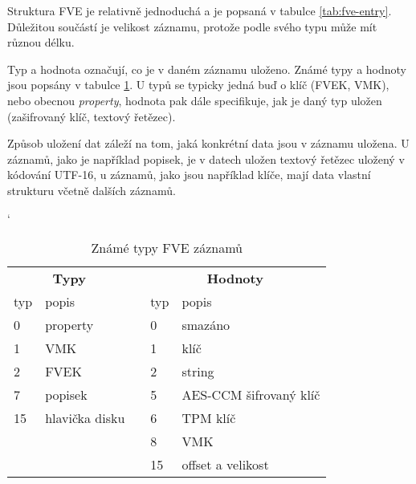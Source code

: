 Struktura FVE je relativně jednoduchá a je popsaná v tabulce \ref{tab:fve-entry}. Důležitou součástí je velikost záznamu, protože podle svého typu může mít různou délku.


Typ a hodnota označují, co je v daném záznamu uloženo. Známé typy a hodnoty jsou popsány v tabulce \ref{tab:fve-entry-types}. U typů se typicky jedná buď o klíč (FVEK, VMK), nebo obecnou \emph{property}, hodnota pak dále specifikuje, jak je daný typ uložen (zašifrovaný klíč, textový řetězec).

Způsob uložení dat záleží na tom, jaká konkrétní data jsou v záznamu uložena. U  záznamů, jako je například popisek, je v datech uložen textový řetězec uložený v kódování UTF-16, u  záznamů, jako jsou například klíče, mají data vlastní strukturu včetně dalších záznamů.

\begin{table}[h]
\catcode`
\captionsetup{width=0.65\linewidth}
\caption{Známé typy FVE záznamů}
\label{tab:fve-entry-types}
\begin{center}
\centering
\begin{tabular}{|l|l|c|l|l|}
  \cline{1-2} \cline{4-5}
   \multicolumn{2}{|c|}{\textbf{Typy}} &  & \multicolumn{2}{|c|}{\textbf{Hodnoty}} \\ \cline{1-2} \cline{4-5}
   typ & popis &  & typ & popis \\ \cline{1-2} \cline{4-5}
   0 & property & & 0 & smazáno \\ \cline{1-2} \cline{4-5}
   1 & VMK & & 1 & klíč \\ \cline{1-2} \cline{4-5}
   2 & FVEK & & 2 & string \\ \cline{1-2} \cline{4-5}
   7 & popisek & & 5 & AES-CCM šifrovaný klíč \\ \cline{1-2} \cline{4-5}
   15 & hlavička disku\footnotemark & & 6 & TPM klíč \\ \cline{1-2} \cline{4-5}
   \multicolumn{2}{c}{} & & 8 & VMK \\ \cline{4-5}
   \multicolumn{2}{c}{} & & 15 & offset a velikost \\ \cline{4-5}
   

\end{tabular}
\end{center}
\end{table}

